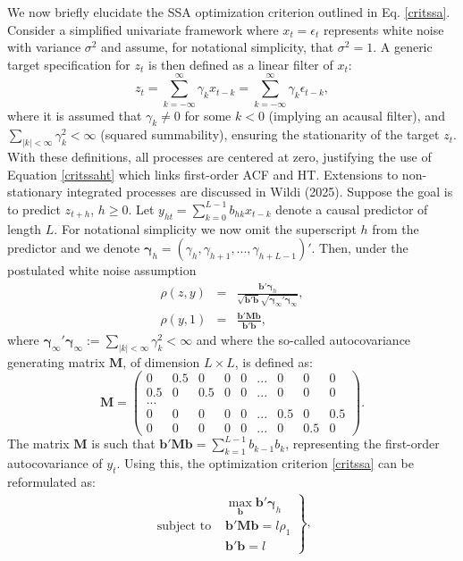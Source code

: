 \documentclass[11pt,a4paper]{article}
\begin{document}
We now briefly elucidate the SSA optimization criterion outlined in Eq. \eqref{critssa}. Consider a simplified univariate framework where $x_t=\epsilon_t$ represents white noise with variance $\sigma^2$ and assume, for notational simplicity, that $\sigma^2=1$. A generic target specification for $z_t$ is then defined as a linear filter of $x_t$:
\[z_t=\sum_{k=-\infty}^\infty \gamma_k x_{t-k}=\sum_{k=-\infty}^\infty \gamma_k \epsilon_{t-k},\] 
where it is assumed that $\gamma_k\neq 0$ for some $k<0$ (implying an acausal filter), and $\sum_{|k|<\infty}\gamma_k^2<\infty$ (squared summability), ensuring the stationarity of the target $z_t$. With these definitions, all processes are centered at zero, justifying the use of Equation \eqref{critssaht} which links first-order ACF and HT. Extensions to non-stationary integrated processes are discussed in Wildi (2025). Suppose the goal is to predict  $z_{t+h}$, $h\geq 0$. Let  $y_{h t}=\sum_{k=0}^{L-1} b_{h k}x_{t-k}$  denote a causal predictor of length $L$. For notational simplicity we now omit the superscript $h$ from the predictor and we denote $\boldsymbol{\gamma}_h=(\gamma_{h},\gamma_{h+1},...,\gamma_{h+L-1})'$. %
Then, under the postulated white noise assumption
\begin{eqnarray*}
\rho(z,y)&=&\frac{\mathbf{b}'\boldsymbol{\gamma}_h}{\sqrt{\mathbf{b}'\mathbf{b}}\sqrt{\boldsymbol{\gamma}_{\infty}'\boldsymbol{\gamma}_{\infty}}},\\
\rho(y,1)&=&\frac{\mathbf{b}'\mathbf{Mb}}{\mathbf{b}'\mathbf{b}},
\end{eqnarray*} 
where $\boldsymbol{\gamma}_{\infty}'\boldsymbol{\gamma}_{\infty}:=\sum_{|k|<\infty}\gamma_k^2<\infty$ and where the so-called autocovariance generating matrix $\mathbf{M}$, of dimension $L\times L$, is defined as:
\[
\mathbf{M}=\left(\begin{array}{ccccccccc}0&0.5&0&0&0&...&0&0&0\\
0.5&0&0.5&0&0&...&0&0&0\\
...&&&&&&&&\\
0&0&0&0&0&...&0.5&0&0.5\\
0&0&0&0&0&...&0&0.5&0
\end{array}\right).
\]
The matrix $\mathbf{M}$ is such that $\mathbf{b}'\mathbf{Mb}=\sum_{k=1}^{L-1}b_{k-1}b_k$, representing the first-order autocovariance of $y_t$.  Using this, the optimization criterion \eqref{critssa} can be reformulated as:
\begin{eqnarray}\label{crit1}
\left.\begin{array}{cc}
&\max_{\mathbf{b}}\mathbf{b}'\boldsymbol{\gamma}_{h}\\
\textrm{subject~to~}&\mathbf{b}'\mathbf{Mb}=l\rho_1\\
&\mathbf{b}'\mathbf{b}=l
\end{array}\right\},
\end{eqnarray}
\end{document}
